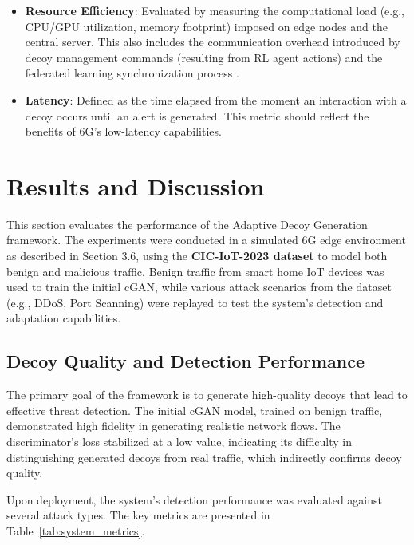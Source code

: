 \documentclass{article}
\begin{document}
\begin{itemize}[label=\textbf{\textbullet}]
\begin{equation}
    \label{eq:adaptability}
    \Delta \mathrm{DR} = \mathrm{DR}_{\mathrm{post-feedback}} - \mathrm{DR}_{\mathrm{pre-feedback}}
    \end{equation}
    A positive value for \(\Delta \mathrm{DR}\) in Equation~\eqref{eq:adaptability} indicates successful adaptation to observed threats.
    \item \textbf{Resource Efficiency}: Evaluated by measuring the computational load (e.g., CPU/GPU utilization, memory footprint) imposed on edge nodes and the central server. This also includes the communication overhead introduced by decoy management commands (resulting from RL agent actions) and the federated learning synchronization process \cite{Shen2021AdaptiveADAC}.
    \item \textbf{Latency}: Defined as the time elapsed from the moment an interaction with a decoy occurs until an alert is generated. This metric should reflect the benefits of 6G's low-latency capabilities.
\end{itemize}

\section{Results and Discussion}

This section evaluates the performance of the Adaptive Decoy Generation framework. The experiments were conducted in a simulated 6G edge environment as described in Section 3.6, using the \textbf{CIC-IoT-2023 dataset} to model both benign and malicious traffic. Benign traffic from smart home IoT devices was used to train the initial cGAN, while various attack scenarios from the dataset (e.g., DDoS, Port Scanning) were replayed to test the system's detection and adaptation capabilities.

\subsection{Decoy Quality and Detection Performance}

The primary goal of the framework is to generate high-quality decoys that lead to effective threat detection. The initial cGAN model, trained on benign traffic, demonstrated high fidelity in generating realistic network flows. The discriminator's loss stabilized at a low value, indicating its difficulty in distinguishing generated decoys from real traffic, which indirectly confirms decoy quality.

Upon deployment, the system's detection performance was evaluated against several attack types. The key metrics are presented in Table~\ref{tab:system_metrics}.
\end{document}
